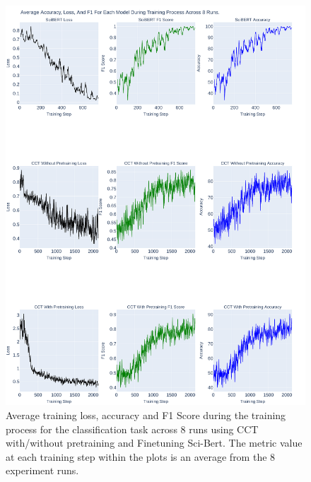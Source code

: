 \begin{figure}[p!]
    \centering
    \includegraphics[width=\maxwidth{\textwidth}]{src/images/Loss-Distriubiton-Train-Set-2.pdf}
    \caption{Average training loss, accuracy and F1 Score during the training process for the classification task across 8 runs using CCT with/without pretraining and Finetuning Sci-Bert. The metric value at each training step within the plots is an average from the 8 experiment runs. }
    \label{figure\arabic{figurecounter}}
\end{figure}

